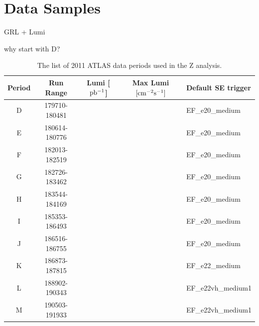 \chapter{Data Samples}
\label{sec:DataSamples}

GRL + Lumi

why start with D?

\begin{figure}[htb]
\end{figure}


\begin{table}[ht!]
\centering
\begin{tabular}{ c | cccl } \hline\hline
Period & Run Range & Lumi [$\rm pb^{-1}$] & Max Lumi $\rm [cm^{-2}s^{-1}]$ & Default SE trigger \\ \hline
D & 179710-180481 & & & EF\_e20\_medium \\
E & 180614-180776 & & & EF\_e20\_medium \\
F & 182013-182519 & & & EF\_e20\_medium \\
G & 182726-183462 & & & EF\_e20\_medium \\
H & 183544-184169 & & & EF\_e20\_medium \\
I & 185353-186493 & & & EF\_e20\_medium \\
J & 186516-186755 & & & EF\_e20\_medium \\
K & 186873-187815 & & & EF\_e22\_medium \\
L & 188902-190343 & & & EF\_e22vh\_medium1 \\
M & 190503-191933 & & & EF\_e22vh\_medium1 \\
\hline
\end{tabular}
\caption{The list of 2011 ATLAS data periods used in the Z analysis.}
\label{tab:data}
\end{table}

